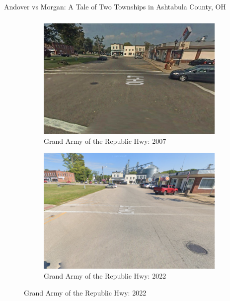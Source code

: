 \documentclass{beamer}
\begin{document}
\begin{frame}{Andover vs Morgan: A Tale of Two Townships in Ashtabula County, OH}
    \frametitle{}

\begin{figure}[htbp]
    \centering
    \begin{minipage}[b]{0.49\textwidth}
        \centering
        \begin{subfigure}[b]{\textwidth}
            \centering
            \includegraphics[width=\textwidth,keepaspectratio]{assets/imgs/andover_township_14grandarmy_2007.png}
            \caption{Grand Army of the Republic Hwy: 2007
            \label{fig:andover_2007}}
        \end{subfigure}
    \end{minipage}
    \hfill
    \begin{minipage}[b]{0.49\textwidth}
        \centering
        \begin{subfigure}[b]{\textwidth}
            \centering
            \includegraphics[width=\textwidth,keepaspectratio]{assets/imgs/andover_township_14grandarmy_2022.png}
            \caption{Grand Army of the Republic Hwy: 2022}
            \label{fig:andover_2022}
        \end{subfigure}
    \end{minipage}


\end{figure}
\end{frame}
\end{document}
